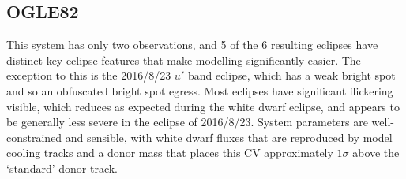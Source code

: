 \newpage
\subsection{OGLE82}

This system has only two observations, and 5 of the 6 resulting eclipses have distinct key eclipse features that make modelling significantly easier. The exception to this is the 2016/8/23 $u'$ band eclipse, which has a weak bright spot and so an obfuscated bright spot egress.
Most eclipses have significant flickering visible, which reduces as expected during the white dwarf eclipse, and appears to be generally less severe in the eclipse of 2016/8/23.
System parameters are well-constrained and sensible, with white dwarf fluxes that are reproduced by model cooling tracks and a donor mass that places this CV approximately $1\sigma$ above the `standard' donor track.


%     

